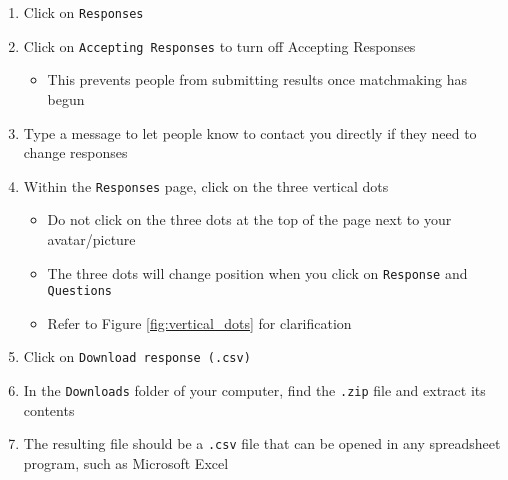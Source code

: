 \begin{enumerate}
	\item Click on \texttt{Responses}
	\item Click on \texttt{Accepting Responses} to turn off Accepting Responses
		\begin{itemize}
			\item This prevents people from submitting results once matchmaking has begun
		\end{itemize}
	\item Type a message to let people know to contact you directly if they need to change responses
	\item Within the \texttt{Responses} page, click on the three vertical dots
		\begin{itemize}
			\item Do not click on the three dots at the top of the page next to your avatar/picture
			\item The three dots will change position when you click on \texttt{Response} and \texttt{Questions}
			\item Refer to Figure \ref{fig:vertical_dots} for clarification
		\end{itemize}
	\item Click on \texttt{Download response (\texttt{.csv})}
	\item In the \texttt{Downloads} folder of your computer, find the \texttt{.zip} file and extract its contents
	\item The resulting file should be a \texttt{.csv} file that can be opened in any spreadsheet program, such as Microsoft Excel
\end{enumerate}









































